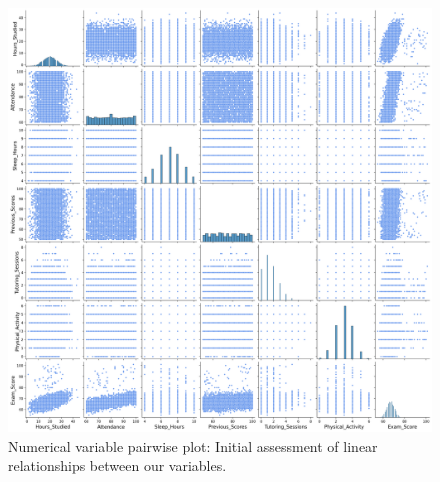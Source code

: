 \documentclass[twocolumn]{article} %
\begin{document}
\begin{figure}[h]
  \centering
  \includegraphics[width=0.9\columnwidth]{3-pairwise-plot.png}
  \caption{Numerical variable pairwise plot: Initial assessment of linear relationships between our variables.}
  \label{3:pairwise}
\end{figure}

\renewcommand{\tablename}{Supplementary Table}
\setcounter{table}{1}
\end{document}

